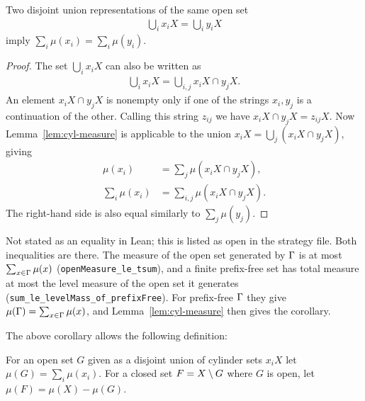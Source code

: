 \begin{corollary}
  \label{cor:g2.3.7}
  Two disjoint union representations of the same open set
 \begin{align*}
   \bigcup_{i}x_{i}X = \bigcup_{i}y_{i}X
 \end{align*}
imply \( \sum_{i}\mu(x_{i})=\sum_{i}\mu(y_{i}) \).
\end{corollary}
\begin{proof}
  The set \( \bigcup_{i}x_{i}X \) can also be written as
 \begin{align*}
  \bigcup_{i}x_{i}X=\bigcup_{i,j} x_{i}X\cap y_{j}X.
\end{align*}
An element \( x_{i}X\cap y_{j}X \) is nonempty only if one of the strings
\( x_{i},y_{j} \) is a continuation of the other.
Calling this string \( z_{ij} \) we have \( x_{i}X\cap y_{j}X=z_{ij}X \).
Now Lemma~\ref{lem:cyl-measure} is applicable to the union
\( x_{i}X=\bigcup_{j}(x_{i}X\cap y_{j}X) \),
giving
 \begin{align*}
        \mu(x_{i}) &=\sum_{j}\mu(x_{i}X\cap y_{j}X),
\\   \sum_{i}\mu(x_{i}) &=\sum_{i,j}\mu(x_{i}X\cap y_{j}X).
\end{align*}
The right-hand side is also equal similarly to \( \sum_{j}\mu(y_{j}) \).
\end{proof}

\begin{formalization}
Not stated as an equality in Lean; this is listed as open in the strategy file. Both
inequalities are there. The measure of the open set generated by \( \Gamma \) is at most
\( \sum_{x \in \Gamma} \mu(x) \) (\texttt{openMeasure\_le\_tsum}), and a finite prefix-free set
has total measure at most the level measure of the open set it generates
(\texttt{sum\_le\_levelMass\_of\_prefixFree}). For prefix-free \( \Gamma \) they give
\( \mu(\Gamma) = \sum_{x \in \Gamma} \mu(x) \), and Lemma~\ref{lem:cyl-measure} then gives the
corollary.
\end{formalization}

The above corollary allows the following definition:

\begin{definition}
  \label{def:g2.3.8}
  \leanok
For an open set \( G \) given as a disjoint union of cylinder sets \( x_{i}X \)
let \( \mu(G)=\sum_{i}\mu(x_{i}) \).
For a closed set \( F=X\setminus G \) where \( G \) is open, let
\( \mu(F)=\mu(X)-\mu(G) \).
\end{definition}

